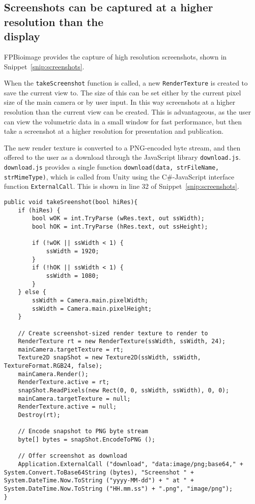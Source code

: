 \subsection[Screenshots can be captured at a higher resolution than the display]{Screenshots can be captured at a higher resolution than the\\ display}
FPBioimage provides the capture of high resolution screenshots, shown in Snippet~\ref{snip:screenshots}.

When the \texttt{takeScreenshot} function is called, a new \texttt{RenderTexture} is created to save the current view to.
The size of this can be set either by the current pixel size of the main camera or by user input.
In this way screenshots at a higher resolution than the current view can be created.
This is advantageous, as the user can view the volumetric data in a small window for fast performance, but then take a screenshot at a higher resolution for presentation and publication.

The new render texture is converted to a PNG-encoded byte stream, and then offered to the user as a download through the JavaScript library \texttt{download.js}.
\texttt{download.js} provides a single function \texttt{download(data, strFileName, strMimeType)}, which is called from Unity using the C\#-JavaScript interface function \texttt{ExternalCall}.
This is shown in line 32 of Snippet~\ref{snip:screenshots}.

\begin{lstfloat}
\begin{lstlisting}[language={[Sharp]c}, label={snip:screenshots}, caption={C\# code for capturing a high-resolution screenshot and presenting it to the user as a download}]
public void takeSreenshot(bool hiRes){
	if (hiRes) {
		bool wOK = int.TryParse (wRes.text, out ssWidth);
		bool hOK = int.TryParse (hRes.text, out ssHeight);

		if (!wOK || ssWidth < 1) {
			ssWidth = 1920;
		}
		if (!hOK || ssWidth < 1) {
			ssWidth = 1080;
		}
	} else {
		ssWidth = Camera.main.pixelWidth;
		ssWidth = Camera.main.pixelHeight;
	}

	// Create screenshot-sized render texture to render to
	RenderTexture rt = new RenderTexture(ssWidth, ssWidth, 24);
	mainCamera.targetTexture = rt;
	Texture2D snapShot = new Texture2D(ssWidth, ssWidth, TextureFormat.RGB24, false);
	mainCamera.Render();
	RenderTexture.active = rt;
	snapShot.ReadPixels(new Rect(0, 0, ssWidth, ssWidth), 0, 0);
	mainCamera.targetTexture = null;
	RenderTexture.active = null;
	Destroy(rt);

	// Encode snapshot to PNG byte stream
	byte[] bytes = snapShot.EncodeToPNG ();

	// Offer screenshot as download
	Application.ExternalCall ("download", "data:image/png;base64," + System.Convert.ToBase64String (bytes), "Screenshot " + System.DateTime.Now.ToString ("yyyy-MM-dd") + " at " + System.DateTime.Now.ToString ("HH.mm.ss") + ".png", "image/png");
}
\end{lstlisting}
\end{lstfloat}

